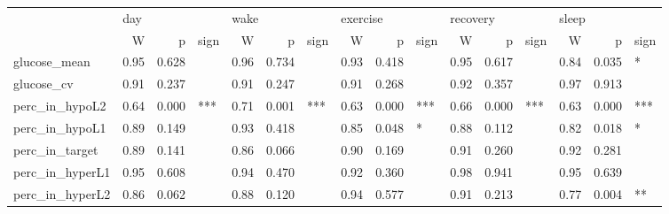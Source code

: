 \begin{tabular}{lrrlrrlrrlrrlrrl}
\toprule
{} & \multicolumn{3}{l}{day} & \multicolumn{3}{l}{wake} & \multicolumn{3}{l}{exercise} & \multicolumn{3}{l}{recovery} & \multicolumn{3}{l}{sleep} \\
{} &     W &      p & sign &     W &      p & sign &        W &      p & sign &        W &      p & sign &     W &      p & sign \\
\midrule
glucose_mean    &  0.95 &  0.628 &      &  0.96 &  0.734 &      &     0.93 &  0.418 &      &     0.95 &  0.617 &      &  0.84 &  0.035 &    * \\
glucose_cv      &  0.91 &  0.237 &      &  0.91 &  0.247 &      &     0.91 &  0.268 &      &     0.92 &  0.357 &      &  0.97 &  0.913 &      \\
perc_in_hypoL2  &  0.64 &  0.000 &  *** &  0.71 &  0.001 &  *** &     0.63 &  0.000 &  *** &     0.66 &  0.000 &  *** &  0.63 &  0.000 &  *** \\
perc_in_hypoL1  &  0.89 &  0.149 &      &  0.93 &  0.418 &      &     0.85 &  0.048 &    * &     0.88 &  0.112 &      &  0.82 &  0.018 &    * \\
perc_in_target  &  0.89 &  0.141 &      &  0.86 &  0.066 &      &     0.90 &  0.169 &      &     0.91 &  0.260 &      &  0.92 &  0.281 &      \\
perc_in_hyperL1 &  0.95 &  0.608 &      &  0.94 &  0.470 &      &     0.92 &  0.360 &      &     0.98 &  0.941 &      &  0.95 &  0.639 &      \\
perc_in_hyperL2 &  0.86 &  0.062 &      &  0.88 &  0.120 &      &     0.94 &  0.577 &      &     0.91 &  0.213 &      &  0.77 &  0.004 &   ** \\
\bottomrule
\end{tabular}
